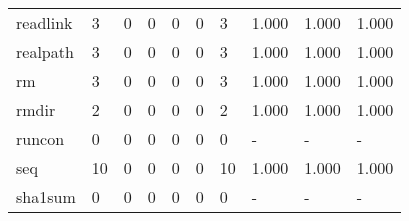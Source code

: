\begin{longtable}{lp{1.3cm}p{1.3cm}p{1.3cm}p{1.3cm}p{1.3cm}p{1.3cm}p{1.3cm}p{1.3cm}p{1.3cm}}
readlink  &                      3 &                                             0 &                                            0 &                                           0 &                                            0 &                                          3 &                                1.000 &                                  1.000 &                                1.000 \\
realpath  &                      3 &                                             0 &                                            0 &                                           0 &                                            0 &                                          3 &                                1.000 &                                  1.000 &                                1.000 \\
rm        &                      3 &                                             0 &                                            0 &                                           0 &                                            0 &                                          3 &                                1.000 &                                  1.000 &                                1.000 \\
rmdir     &                      2 &                                             0 &                                            0 &                                           0 &                                            0 &                                          2 &                                1.000 &                                  1.000 &                                1.000 \\
runcon    &                      0 &                                             0 &                                            0 &                                           0 &                                            0 &                                          0 &                                    - &                                      - &                                    - \\
seq       &                     10 &                                             0 &                                            0 &                                           0 &                                            0 &                                         10 &                                1.000 &                                  1.000 &                                1.000 \\
sha1sum   &                      0 &                                             0 &                                            0 &                                           0 &                                            0 &                                          0 &                                    - &                                      - &                                    - \\

\end{longtable}
